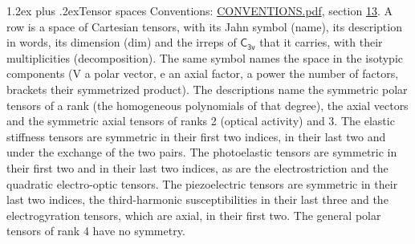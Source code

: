 \documentclass[10pt,a4paper]{article}
\makeatletter
\renewcommand\section{\@startsection{section}{1}{\z@}{-3ex plus -1ex minus -.2ex}%
  {1.2ex plus .2ex}{\normalfont\large\sffamily\bfseries\color{parttitle}}}
\numberwithin{equation}{section}
\newcommand{\grp}[1]{\mathsf{#1}}
\makeatother
\begin{document}
\section{Tensor spaces}\label{s:tensor_spaces}
Conventions: \href{../../CONVENTIONS.pdf}{CONVENTIONS.pdf}, section \href{../../CONVENTIONS.pdf\#conv.13}{13}.
\leavevmode\label{n:head.name}\label{n:head.description}\label{n:head.dim}\label{n:head.decomposition}A row is a space of Cartesian tensors, with its Jahn symbol (name), its description in words, its dimension (dim) and the irreps of $\grp{C_{3v}}$ that it carries, with their multiplicities (decomposition). \label{n:label.jahn}The same symbol names the space in the isotypic components (V a polar vector, e an axial factor, a power the number of factors, brackets their symmetrized product). The descriptions name the symmetric polar tensors of a rank (the homogeneous polynomials of that degree), the axial vectors and the symmetric axial tensors of ranks 2 (optical activity) and 3. The elastic stiffness tensors are symmetric in their first two indices, in their last two and under the exchange of the two pairs. The photoelastic tensors are symmetric in their first two and in their last two indices, as are the electrostriction and the quadratic electro-optic tensors. The piezoelectric tensors are symmetric in their last two indices, the third-harmonic susceptibilities in their last three and the electrogyration tensors, which are axial, in their first two. The general polar tensors of rank 4 have no symmetry.
\end{document}
